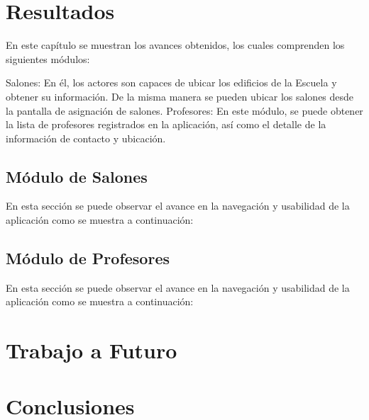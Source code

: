 \section{Resultados}

En este capítulo se muestran los avances obtenidos, los cuales comprenden los siguientes módulos:\\

\begin{UClist} 
	\UCli Salones: En él, los actores son capaces de ubicar los edificios de la Escuela y obtener su información. De la misma manera se pueden ubicar los salones desde la pantalla de asignación de salones.
	\UCli Profesores: En este módulo, se puede obtener la lista de profesores registrados en la aplicación, así como el detalle de la información de contacto y ubicación.
\end{UClist} 

\subsection{Módulo de Salones}

En esta sección se puede observar el avance en la navegación y usabilidad de la aplicación como se muestra a continuación:


\subsection{Módulo de Profesores}

En esta sección se puede observar el avance en la navegación y usabilidad de la aplicación como se muestra a continuación:


\section{Trabajo a Futuro}



\section{Conclusiones}